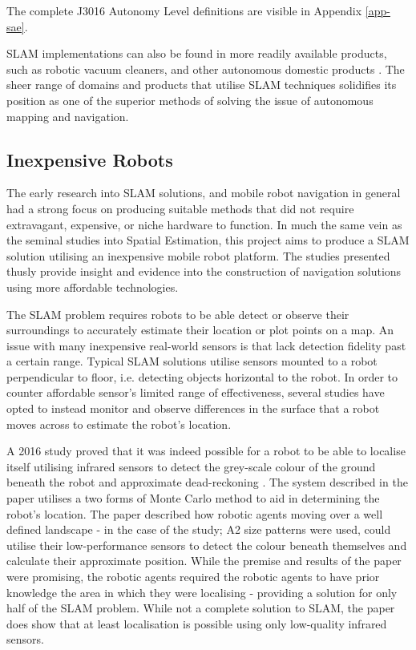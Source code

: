 The complete J3016 Autonomy Level definitions are visible in Appendix
\ref{app-sae}. 

SLAM implementations can also be found in more readily available products,
such as robotic vacuum cleaners, and other autonomous  domestic products
\cite{forlizzi2006service}.
The sheer range of domains and products that utilise SLAM techniques
solidifies its position as one of the superior methods of solving the issue of
autonomous mapping and navigation.



\subsection{Inexpensive Robots}
The early research into SLAM solutions, and mobile robot navigation in general
had a strong focus on producing suitable methods that did not require
extravagant, expensive, or niche hardware to function.
In much the same vein as the seminal studies into Spatial Estimation, this
project aims to produce a SLAM solution utilising an inexpensive mobile
robot platform.
The studies presented thusly provide insight and evidence into the
construction of navigation solutions using more affordable technologies.

The SLAM problem requires robots to be able detect or observe their
surroundings to accurately estimate their location or plot points on a map.
An issue with many inexpensive real-world sensors is that lack detection
fidelity past a certain range.
Typical SLAM solutions utilise sensors mounted to a robot perpendicular to
floor, i.e. detecting objects horizontal to the robot.
In order to counter affordable sensor's limited range of effectiveness, several
studies have opted to instead monitor and observe differences in the surface
that a robot moves across to estimate the robot's location.

A 2016 study proved that it was indeed possible for a robot to be able to
localise itself utilising infrared sensors to detect the grey-scale colour of
the ground beneath the robot and approximate dead-reckoning \cite{Wang2016}.
The system described in the paper utilises a two forms of  Monte Carlo
method to aid in determining the robot's location.
The paper described how robotic agents moving over a well defined landscape -
in the case of the study; A2 size patterns were used, could utilise
their low-performance sensors to detect the colour beneath themselves and
calculate their approximate position.
While the premise and results of the paper were promising, the robotic agents
required the robotic agents to have prior knowledge the area in which they
were localising - providing a solution for only half of the SLAM problem.
While not a complete solution to SLAM, the paper does show that at least
localisation is possible using only low-quality infrared sensors.

